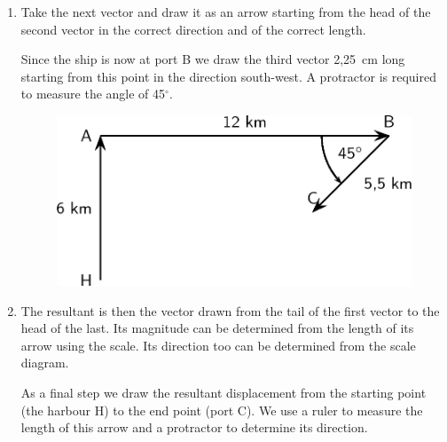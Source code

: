 {\begin{mdframed}[linewidth=4, leftmargin=40, rightmargin=40]
\begin{exercise}
\begin{enumerate}[noitemsep, label=\textbf{Step} \textbf{\arabic*}. ]
          \par 
          \item  
\label{m38815*id6211}Take the next vector and draw it as an arrow starting from the
head of the second vector in the correct direction and of the
correct length. 
\par 
          \label{m38815*id189498}Since the ship is now at port B we draw the third vector 2,25~cm long starting from this point in the direction south-west. A protractor is required to measure the angle of 45\begin{math}{}^{\circ }\end{math}.\par 
          \label{m38815*id189518}
            
    \setcounter{subfigure}{0}


	\begin{figure}[H] %
    \begin{center}
    \label{m38815*id189521!!!underscore!!!media}\label{m38815*id189521!!!underscore!!!printimage}\includegraphics{col11305.imgs/m38815_PG11C1_043.png} %
        
      \vspace{2pt}
    \vspace{.1in}
    
    \end{center}

 \end{figure}   

    \addtocounter{footnote}{-0}
    
          \par 
          \item  
\label{m38815*id1342}The resultant is then the vector drawn from the tail of the
first vector to the head of the last. Its magnitude can be
determined from the length of its arrow using the scale. Its
direction too can be determined from the scale diagram.
\par 
          \label{m38815*id189533}As a final step we draw the resultant displacement from
the starting point (the harbour H) to the end point (port C). We use a
ruler to measure the length of this arrow and a protractor to determine its direction.\par 
          \label{m38815*id189538}
            

\end{enumerate}
\end{exercise}
\end{mdframed}}

